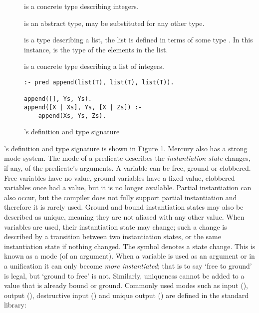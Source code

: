 \begin{description}

    \item[] is a concrete type describing integers.

    \item[] is an abstract type,  may be substituted for any other
    type.

    \item[] is a type describing a list, the list is defined
    in terms of some type .
    In this instance,  is the type of the elements in the list.

    \item[] is a concrete type describing a list of
    integers.

\end{description}

\begin{figure}
\begin{verbatim}
:- pred append(list(T), list(T), list(T)).

append([], Ys, Ys).
append([X | Xs], Ys, [X | Zs]) :-
    append(Xs, Ys, Zs).
\end{verbatim}
\caption{'s definition and type signature}
\label{fig:append_type_and_defn}
\end{figure}

\noindent
{}'s definition and type signature is shown in Figure
\ref{fig:append_type_and_defn}.
Mercury also has a strong mode system.
The mode of a predicate describes the \emph{instantiation state} changes,
if any, of the predicate's arguments.
A variable can be free, ground or clobbered.
Free variables have no value,
ground variables have a fixed value,
clobbered variables once had a value, but it is no longer available.
Partial instantiation can also occur,
but the compiler does not fully support partial instantiation
and therefore it is rarely used.
Ground and bound instantiation states may also be described as unique,
meaning they are not aliased with any other value.
When variables are used, their instantiation state may change;
such a change is described by a transition between two instantiation states,
or the same instantiation state if nothing changed.
The symbol \code{>>} denotes a state change.
This is known as a mode (of an argument).
When a variable is used as an argument or in a unification it can only
become \emph{more instantiated};
that is to say `free to ground' is legal, but `ground to free' is not.
Similarly, uniqueness cannot be added to a value that is already
bound or ground.
Commonly used modes such as input (), output (),
destructive input () and unique output () are
defined in the standard library:

